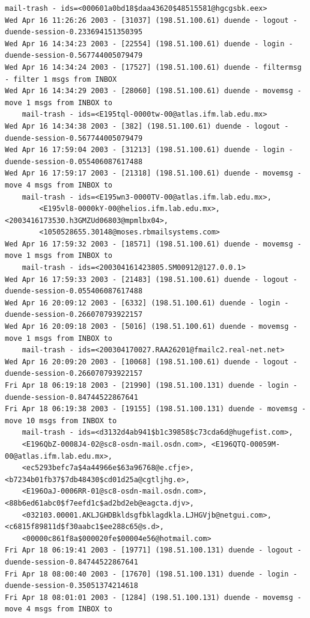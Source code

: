 \begin{lstlisting}[style=terminal]
    mail-trash - ids=<000601a0bd18$daa43620$48515581@hgcgsbk.eex>
Wed Apr 16 11:26:26 2003 - [31037] (198.51.100.61) duende - logout - duende-session-0.233694151350395
Wed Apr 16 14:34:23 2003 - [22554] (198.51.100.61) duende - login - duende-session-0.567744005079479
Wed Apr 16 14:34:24 2003 - [17527] (198.51.100.61) duende - filtermsg - filter 1 msgs from INBOX
Wed Apr 16 14:34:29 2003 - [28060] (198.51.100.61) duende - movemsg - move 1 msgs from INBOX to 
    mail-trash - ids=<E195tql-0000tw-00@atlas.ifm.lab.edu.mx>
Wed Apr 16 14:34:38 2003 - [382] (198.51.100.61) duende - logout - duende-session-0.567744005079479
Wed Apr 16 17:59:04 2003 - [31213] (198.51.100.61) duende - login - duende-session-0.055406087617488
Wed Apr 16 17:59:17 2003 - [21318] (198.51.100.61) duende - movemsg - move 4 msgs from INBOX to 
    mail-trash - ids=<E195wn3-0000TV-00@atlas.ifm.lab.edu.mx>, 
        <E195vl8-0000kY-00@helios.ifm.lab.edu.mx>, <2003416173530.h3GMZUd06803@mpmlbx04>, 
        <1050528655.30148@moses.rbmailsystems.com>
Wed Apr 16 17:59:32 2003 - [18571] (198.51.100.61) duende - movemsg - move 1 msgs from INBOX to 
    mail-trash - ids=<200304161423805.SM00912@127.0.0.1>
Wed Apr 16 17:59:33 2003 - [21483] (198.51.100.61) duende - logout - duende-session-0.055406087617488
Wed Apr 16 20:09:12 2003 - [6332] (198.51.100.61) duende - login - duende-session-0.266070793922157
Wed Apr 16 20:09:18 2003 - [5016] (198.51.100.61) duende - movemsg - move 1 msgs from INBOX to 
    mail-trash - ids=<200304170027.RAA26201@fmailc2.real-net.net>
Wed Apr 16 20:09:20 2003 - [10068] (198.51.100.61) duende - logout - duende-session-0.266070793922157
Fri Apr 18 06:19:18 2003 - [21990] (198.51.100.131) duende - login - duende-session-0.84744522867641
Fri Apr 18 06:19:38 2003 - [19155] (198.51.100.131) duende - movemsg - move 10 msgs from INBOX to 
    mail-trash - ids=<d3132d4ab941$b1c39858$c73cda6d@hugefist.com>, 
    <E196QbZ-0008J4-02@sc8-osdn-mail.osdn.com>, <E196QTQ-00059M-00@atlas.ifm.lab.edu.mx>, 
    <ec5293befc7a$4a44966e$63a96768@e.cfje>, <b7234b01fb37$7db48430$cd01d25a@cgtljhg.e>, 
    <E196OaJ-0006RR-01@sc8-osdn-mail.osdn.com>, <88b6ed61abc0$f7eefd1c$ad2bd2eb@eagcta.djv>, 
    <032103.00001.AKLJGHDBkldsgfbklagdkla.LJHGVjb@netgui.com>, <c6815f89811d$f30aabc1$ee288c65@s.d>, 
    <00000c861f8a$000020fe$00004e56@hotmail.com>
Fri Apr 18 06:19:41 2003 - [19771] (198.51.100.131) duende - logout - duende-session-0.84744522867641
Fri Apr 18 08:00:40 2003 - [17670] (198.51.100.131) duende - login - duende-session-0.35051374214618
Fri Apr 18 08:01:01 2003 - [1284] (198.51.100.131) duende - movemsg - move 4 msgs from INBOX to 

\end{lstlisting}
